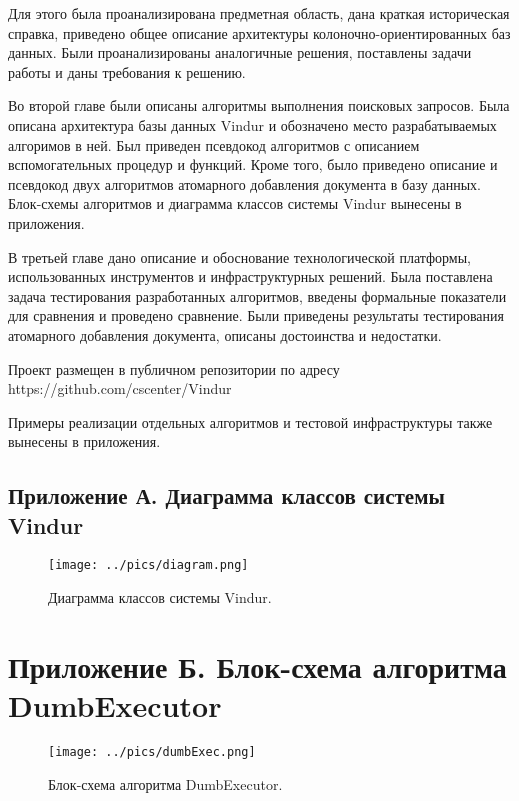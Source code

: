 \documentclass{matmex-diploma}
\begin{document}
    Для этого была проанализирована предметная область, дана краткая историческая справка, приведено общее описание архитектуры колоночно-ориентированных баз данных. Были проанализированы аналогичные решения, поставлены задачи работы и даны требования к решению.
    
    Во второй главе были описаны алгоритмы выполнения поисковых запросов. Была описана архитектура базы данных Vindur и обозначено место разрабатываемых алгоримов в ней. Был приведен псевдокод алгоритмов с описанием вспомогательных процедур и функций. Кроме того, было приведено описание и псевдокод двух алгоритмов атомарного добавления документа в базу данных. Блок-схемы алгоритмов и диаграмма классов системы Vindur вынесены в приложения.
    
    В третьей главе дано описание и обоснование технологической платформы, использованных инструментов и инфраструктурных решений. Была поставлена задача тестирования разработанных алгоритмов, введены формальные показатели для сравнения и проведено сравнение. Были приведены результаты тестирования атомарного добавления документа, описаны достоинства и недостатки.
    
    Проект размещен в публичном репозитории по адресу https://github.com/cscenter/Vindur
    
    Примеры реализации отдельных алгоритмов и тестовой инфраструктуры также вынесены в приложения.




\begin{landscape}
    \thispagestyle{empty}
    \section*{Приложение А. Диаграмма классов системы Vindur}
        \begin{figure}[H]
            \label{classes}
            \centering
            \texttt{[image: ../pics/diagram.png]}
            \caption{Диаграмма классов системы Vindur.}
        \end{figure}
\end{landscape}

\section*{Приложение Б. Блок-схема алгоритма DumbExecutor}
    \begin{figure}[H]
        \label{dumbAlgo}
        \centering
        \texttt{[image: ../pics/dumbExec.png]}
        \caption{Блок-схема алгоритма DumbExecutor.}
    \end{figure}
\end{document}
